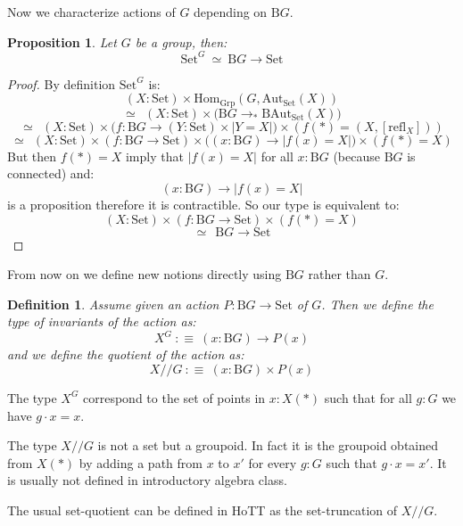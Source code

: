 \documentclass{article}
\renewcommand{\r}{\rightarrow}
\newcommand{\refl}{\mathrm{refl}}
\newcommand{\Grp}{\mathrm{Grp}}
\newcommand{\Hom}{\mathrm{Hom}}
\newcommand{\B}{\mathrm{B}}
\newcommand{\Aut}{\mathrm{Aut}}
\newcommand{\Set}{\mathrm{Set}}
\newtheorem{definition}{Definition}
\newtheorem{proposition}{Proposition}
\begin{document}
Now we characterize actions of $G$ depending on $\B G$.

\begin{proposition}
Let $G$ be a group, then:
\[\Set^G \ \simeq \ \B G\r \Set\]
\end{proposition}
\begin{proof}
By definition $\Set^G$ is:
\[(X:\Set)\times \Hom_\Grp(G,\Aut_\Set(X))\]
\[\simeq \ \ (X:\Set)\times \big(\B G \r_*\B\Aut_\Set(X)\big)\]
\[\simeq \ \ (X:\Set)\times \big(f : \B G \r (Y:\Set)\times |Y=X|\big) \times (f(*) = (X,[\refl_X]))\]
\[\simeq \ \ (X:\Set)\times (f : \B G \r \Set)\times \big((x:\B G) \r |f(x) = X|\big) \times (f(*) = X)\]
But then $f(*) = X$ imply that $|f(x) = X|$ for all $x:\B G$ (because $\B G$ is connected) and:
\[(x:\B G) \r |f(x) = X|\]
 is a proposition therefore it is contractible. So our type is equivalent to:
\[(X:\Set)\times (f : \B G \r \Set)\times (f(*) = X)\]
\[\simeq \ \ \B G\r \Set\]
\end{proof}

From now on we define new notions directly using $\B G$ rather than $G$.

\begin{definition}
Assume given an action $P:\B G\r \Set$ of $G$. Then we define the type of invariants of the action as:
\[X^G \ :\equiv \ (x:\B G)\r P(x)\]
and we define the quotient of the action as:
\[X//G \ :\equiv\ (x:\B G)\times P(x)\]
\end{definition}

The type $X^G$ correspond to the set of points in $x:X(*)$ such that for all $g:G$ we have $g\cdot x = x$.%

The type $X//G$ is not a set but a groupoid. In fact it is the groupoid obtained from $X(*)$ by adding a path from $x$ to $x'$ for every $g:G$ such that $g\cdot x = x'$. It is usually not defined in introductory algebra class. 

The usual set-quotient can be defined in HoTT as the set-truncation of $X//G$.%
\end{document}
